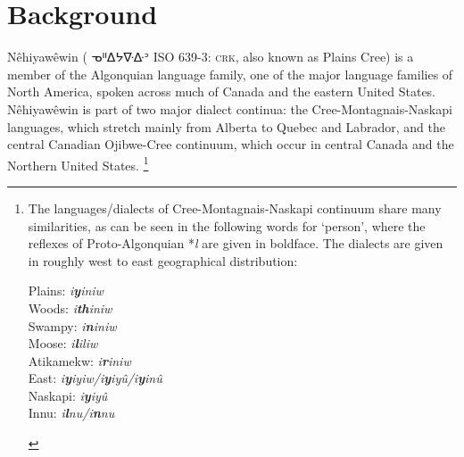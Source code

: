 	\chapter{Background}
	\label{ch:order}
Nêhiyawêwin ( ᓀᐦᐃᔭᐍᐏᐣ \textsc{ISO 639-3: crk}, also known as Plains Cree) is a member of the Algonquian language family, one of the major language families of North America, spoken across much of Canada and the eastern United States. Nêhiyawêwin is part of two major dialect continua: the Cree-Montagnais-Naskapi languages, which stretch mainly from Alberta to Quebec and Labrador, and the central Canadian Ojibwe-Cree continuum, which occur in central Canada and the Northern United States. \footnote{The languages/dialects of Cree-Montagnais-Naskapi continuum share many similarities, as can be seen in the following words for `person', where the reflexes of Proto-Algonquian *\textit{l} are given in boldface. The dialects are given in roughly west to east geographical distribution:

\begin{exe}
\ex
Plains: \textit{i\textbf{y}iniw}\\
Woods: \textit{i\textbf{th}iniw}\\
Swampy: \textit{i\textbf{n}iniw}\\
Moose: \textit{i\textbf{l}iliw}\\
Atikamekw: \textit{i\textbf{r}iniw}\\
East: \textit{i\textbf{y}iyiw/i\textbf{y}iyû/i\textbf{y}inû}\\
Naskapi: \textit{i\textbf{y}iyû}\\
Innu: \textit{i\textbf{l}nu/i\textbf{n}nu}
\end{exe}
}

